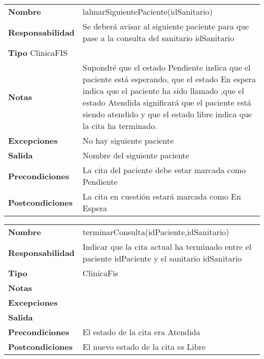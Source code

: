 
\begin{table}[htbp]
	  \begin{tabularx}{\textwidth}{l|l}
    \textbf{Nombre}        & lalmarSiguientePaciente(idSanitario) \\ 
    \textbf{Responsabilidad}  &  Se deberá avisar al siguiente paciente para que pase a la consulta del sanitario idSanitario \\ 
    \textbf{Tipo}  ClinicaFIS      &  \\ 
    \textbf{Notas}        & Supondré que el estado Pendiente indica que el paciente está esperando, que el estado En espera indica que el paciente ha sido llamado ,que el estado Atendida significará que el paciente está siendo atendido y que el estado libre indica que la cita ha terminado.  \\ 
    \textbf{Excepciones}    & No hay siguiente paciente \\ 
    \textbf{Salida}        & Nombre del siguiente paciente\\ 
    \textbf{Precondiciones}    & La cita del paciente debe estar marcada como Pendiente \\ 
    \textbf{Postcondiciones}  & La cita en cuestión estará marcada como En Espera \\ 
  \end{tabularx}

\end{table}


\begin{table}[htbp]
	  \begin{tabularx}{\textwidth}{l|l}
    \textbf{Nombre}        & terminarConsulta(idPaciente,idSanitario) \\ 
    \textbf{Responsabilidad}  & Indicar que la cita actual ha terminado entre el paciente idPaciente y el sanitario idSanitario \\ 
    \textbf{Tipo}        &  ClinicaFis\\ 
    \textbf{Notas}        &  \\ 
    \textbf{Excepciones}    &  \\ 
    \textbf{Salida}        &  \\ 
    \textbf{Precondiciones}    & El estado de la cita era Atendida  \\ 
    \textbf{Postcondiciones}  & El nuevo estado de la cita es Libre\\ 
  \end{tabularx}

\end{table}

